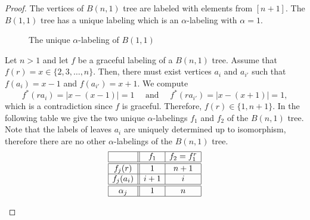 \documentclass[10pt]{article}
\theoremstyle{definition}
\begin{document}
\begin{proof}
  The vertices of $B(n,1)$ tree are labeled with elements from $[n+1]$. The $B(1,1)$ tree has a unique labeling which is an $\alpha$-labeling with $\alpha = 1$.

  \begin{figure}[H]
    \centering
    \caption{The unique $\alpha$-labeling of $B(1,1)$}
    \label{fig:rsf-banana-tree-1-1}
  \end{figure}
  Let $n > 1$ and let $f$ be a graceful labeling of a $B(n, 1)$ tree. Assume that $f(r) = x \in \{2, 3, \dots, n\}$. Then, there must exist vertices $a_i$ and $a_{i'}$ such that $f(a_i) = x - 1$ and $f(a_{i'}) = x + 1$. We compute
  $$
  f^*(r a_i) = |x - (x-1)| = 1 \quad \mbox{ and } \quad f^*(r a_{i'}) = |x - (x+1)| = 1,
  $$
  which is a contradiction since $f$ is graceful. Therefore, $f(r) \in \{1, n+1\}$. In the following table we give the two unique $\alpha$-labelings $f_1$ and $f_2$ of the $B(n,1)$ tree. Note that the labels of leaves $a_i$ are uniquely determined up to isomorphism, therefore there are no other $\alpha$-labelings of the $B(n,1)$ tree.
  $$
  \begin{array}{|c||c|c|}
    \hline
    & f_1 & f_2 = f_1^r  \\
    \hline \hline
    f_j(r) & 1 & n+1  \\
    \hline
    f_j(a_i) & i+1 & i  \\
    \hline \hline
    \alpha_j & 1 & n  \\
    \hline
  \end{array}
  $$

  \begin{figure}[H]
    \centering
    \begin{minipage}{0.4\textwidth}
      \centering
\end{minipage}
\end{figure}
\end{proof}
\end{document}
